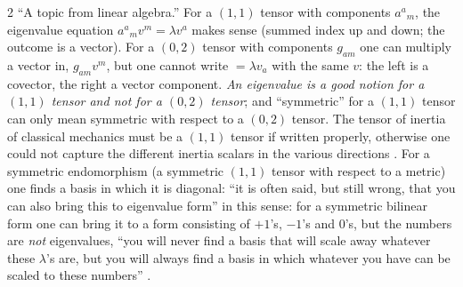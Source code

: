 \begin{paracol}{2}
``A topic from linear algebra.'' For a $(1,1)$ tensor with components $a^a{}_m$, the eigenvalue equation $a^a{}_mv^m=\lambda v^a$ makes sense (summed index up and down; the outcome is a vector). For a $(0,2)$ tensor with components $g_{am}$ one can multiply a vector in, $g_{am}v^m$, but one cannot write $=\lambda v_a$ with the same $v$: the left is a covector, the right a vector component. \emph{An eigenvalue is a good notion for a $(1,1)$ tensor and not for a $(0,2)$ tensor}; and ``symmetric'' for a $(1,1)$ tensor can only mean symmetric with respect to a $(0,2)$ tensor. The tensor of inertia of classical mechanics must be a $(1,1)$ tensor if written properly, otherwise one could not capture the different inertia scalars in the various directions
.
For a symmetric endomorphism (a symmetric $(1,1)$ tensor with respect to a metric) one finds a basis in which it is diagonal: ``it is often said, but still wrong, that you can also bring this to eigenvalue form'' in this sense: for a symmetric bilinear form one can bring it to a form consisting of $+1$'s, $-1$'s and $0$'s, but the numbers are \emph{not} eigenvalues, ``you will never find a basis that will scale away whatever these $\lambda$'s are, but you will always find a basis in which whatever you have can be scaled to these numbers'' .


\end{paracol}
